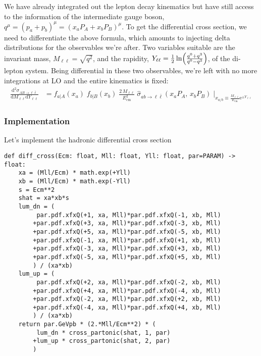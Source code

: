 \documentclass[11pt]{article}
\begin{document}
We have already integrated out the lepton decay kinematics but have still access to the information of the intermediate gauge boson, \(q^\mu = (p_a+p_b)^\mu = (x_a P_A + x_b P_B)^\mu\).
To get the differential cross section, we need to differentiate the above formula, which amounts to injecting delta distributions for the observables we're after.
Two variables suitable are the invariant mass, \(M_{\ell\ell} = \sqrt{q^2}\), and the rapidity, \(Y_{\ell\ell} = \tfrac{1}{2}\ln\Bigl(\tfrac{q^0+q^3}{q^0-q^3}\Bigr)\), of the di-lepton system.
Being differential in these two observables, we're left with no more integrations at LO and the entire kinematics is fixed:
\begin{align}
  \frac{\mathrm{d}^2\sigma_{A B \to \ell\bar{\ell}}}{\mathrm{d}M_{\ell\ell}\mathrm{d}Y_{\ell\ell}}
  &=
  f_{a\vert A}(x_a) \; f_{b\vert B}(x_b) \; \frac{2\,M_{\ell\ell}}{E_\mathrm{cm}^2} \;
  \hat{\sigma}_{ab\to\ell\bar{\ell}}(x_a P_A,\,x_b P_B)
  \;\bigg\vert_{x_{a/b}\equiv\tfrac{M_{\ell\ell}}{E_\mathrm{cm}}\mathrm{e}^{\pm Y_{\ell\ell}}}
\end{align}

\subsubsection{Implementation}
\label{sec:org85500c7}
Let's implement the hadronic differential cross section
\begin{verbatim}
def diff_cross(Ecm: float, Mll: float, Yll: float, par=PARAM) -> float:
    xa = (Mll/Ecm) * math.exp(+Yll)
    xb = (Mll/Ecm) * math.exp(-Yll)
    s = Ecm**2
    shat = xa*xb*s
    lum_dn = (
         par.pdf.xfxQ(+1, xa, Mll)*par.pdf.xfxQ(-1, xb, Mll)
        +par.pdf.xfxQ(+3, xa, Mll)*par.pdf.xfxQ(-3, xb, Mll)
        +par.pdf.xfxQ(+5, xa, Mll)*par.pdf.xfxQ(-5, xb, Mll)
        +par.pdf.xfxQ(-1, xa, Mll)*par.pdf.xfxQ(+1, xb, Mll)
        +par.pdf.xfxQ(-3, xa, Mll)*par.pdf.xfxQ(+3, xb, Mll)
        +par.pdf.xfxQ(-5, xa, Mll)*par.pdf.xfxQ(+5, xb, Mll)
        ) / (xa*xb)
    lum_up = (
         par.pdf.xfxQ(+2, xa, Mll)*par.pdf.xfxQ(-2, xb, Mll)
        +par.pdf.xfxQ(+4, xa, Mll)*par.pdf.xfxQ(-4, xb, Mll)
        +par.pdf.xfxQ(-2, xa, Mll)*par.pdf.xfxQ(+2, xb, Mll)
        +par.pdf.xfxQ(-4, xa, Mll)*par.pdf.xfxQ(+4, xb, Mll)
        ) / (xa*xb)
    return par.GeVpb * (2.*Mll/Ecm**2) * (
         lum_dn * cross_partonic(shat, 1, par)
        +lum_up * cross_partonic(shat, 2, par)
        )
\end{verbatim}
\end{document}
